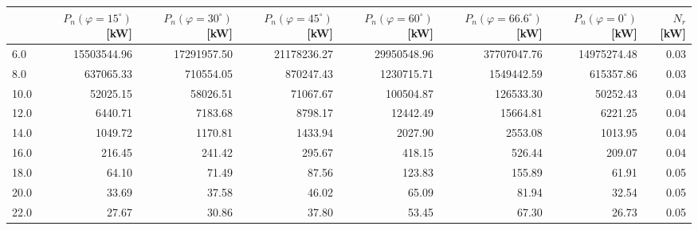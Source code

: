 \begin{tabular}{lrrrrrrr}
\toprule
{} &  $P_n (\varphi = 15^\circ)$ [kW] &  $P_n (\varphi = 30^\circ)$ [kW] &  $P_n (\varphi = 45^\circ)$ [kW] &  $P_n (\varphi = 60^\circ)$ [kW] &  $P_n (\varphi = 66.6^\circ)$ [kW] &  $P_n(\varphi = {0}^\circ)$ [kW] &  $N_r$ [kW] \\
\midrule
6.0  &                      15503544.96 &                      17291957.50 &                      21178236.27 &                      29950548.96 &                        37707047.76 &                      14975274.48 &        0.03 \\
8.0  &                        637065.33 &                        710554.05 &                        870247.43 &                       1230715.71 &                         1549442.59 &                        615357.86 &        0.03 \\
10.0 &                         52025.15 &                         58026.51 &                         71067.67 &                        100504.87 &                          126533.30 &                         50252.43 &        0.04 \\
12.0 &                          6440.71 &                          7183.68 &                          8798.17 &                         12442.49 &                           15664.81 &                          6221.25 &        0.04 \\
14.0 &                          1049.72 &                          1170.81 &                          1433.94 &                          2027.90 &                            2553.08 &                          1013.95 &        0.04 \\
16.0 &                           216.45 &                           241.42 &                           295.67 &                           418.15 &                             526.44 &                           209.07 &        0.04 \\
18.0 &                            64.10 &                            71.49 &                            87.56 &                           123.83 &                             155.89 &                            61.91 &        0.05 \\
20.0 &                            33.69 &                            37.58 &                            46.02 &                            65.09 &                              81.94 &                            32.54 &        0.05 \\
22.0 &                            27.67 &                            30.86 &                            37.80 &                            53.45 &                              67.30 &                            26.73 &        0.05 \\

\end{tabular}
